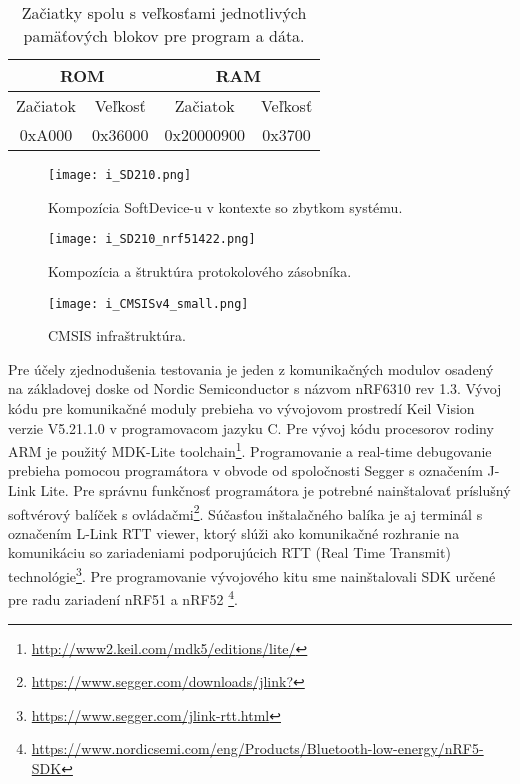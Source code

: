 \documentclass[12pt,a4wide,oneside,openright]{report}
\begin{document}
\begin{table}[h]
	\centering
	\caption{Začiatky spolu s veľkosťami jednotlivých pamäťových blokov pre program a dáta.}
	\label{t:s210_memory}
	\begin{tabular}{|c|c|c|c|}
		\hline
		\multicolumn{2}{|c|}{ROM} & \multicolumn{2}{c|}{RAM} \\ \hline
		Začiatok     & Veľkosť    & Začiatok     & Veľkosť   \\ \hline
		0xA000       & 0x36000    & 0x20000900   & 0x3700    \\ \hline
	\end{tabular}
\end{table}

\begin{figure*}[h]
	\centering
	\texttt{[image: i\_SD210.png]}
	\caption{Kompozícia SoftDevice-u v kontexte so zbytkom systému\cite{SD210}.}
	\label{f:o_SD210}
\end{figure*}

\begin{figure*}[h]
	\centering
	\texttt{[image: i\_SD210\_nrf51422.png]}
	\caption{Kompozícia a štruktúra protokolového zásobníka\cite{SD210}.}
	\label{f:o_SD210_alone}
\end{figure*}

\begin{figure*}[h]
	\centering
	\texttt{[image: i\_CMSISv4\_small.png]}
	\caption{CMSIS infraštruktúra\cite{CMSIS}.}
	\label{f:o_CMSIS}
\end{figure*}
Pre účely zjednodušenia testovania je jeden z komunikačných modulov osadený na základovej doske od Nordic Semiconductor s názvom nRF6310 rev 1.3.
Vývoj kódu pre komunikačné moduly prebieha vo vývojovom prostredí Keil {\textmu}Vision verzie V5.21.1.0 v programovacom jazyku C. Pre vývoj kódu procesorov rodiny ARM je použitý MDK-Lite toolchain\footnote{\url{http://www2.keil.com/mdk5/editions/lite/}}. 
Programovanie a real-time debugovanie prebieha pomocou programátora v obvode od spoločnosti Segger s označením J-Link Lite. Pre správnu funkčnosť programátora je potrebné nainštalovať príslušný softvérový balíček s ovládačmi\footnote{\url{https://www.segger.com/downloads/jlink?}}. Súčasťou inštalačného balíka je aj terminál s označením L-Link RTT viewer, ktorý slúži ako komunikačné rozhranie na komunikáciu so zariadeniami podporujúcich RTT (Real Time Transmit) technológie\footnote{\url{https://www.segger.com/jlink-rtt.html}}.
Pre programovanie vývojového kitu sme nainštalovali SDK určené pre radu zariadení nRF51 a nRF52 \footnote{\url{https://www.nordicsemi.com/eng/Products/Bluetooth-low-energy/nRF5-SDK}}.
\end{document}
